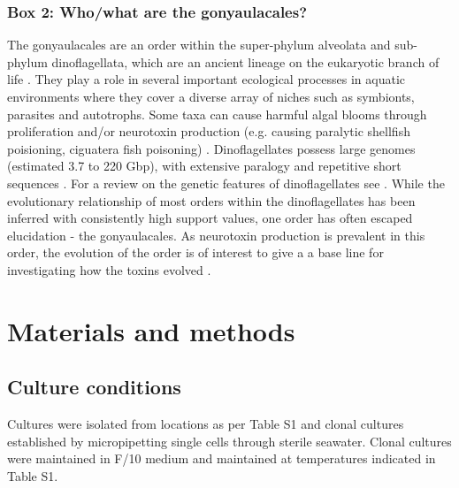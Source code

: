 \documentclass[12pt]{article}
\begin{document}
\subsubsection*{Box 2: Who/what are the gonyaulacales?}
The gonyaulacales are an order within the super-phylum alveolata and sub-phylum dinoflagellata, which are an ancient lineage on the eukaryotic branch of life \cite{moldowan1998biogeochemical}. 
They play a role in several important ecological processes in aquatic environments where they cover a diverse array of niches such as symbionts, parasites and autotrophs. 
Some taxa can cause harmful algal blooms through proliferation and/or neurotoxin production (e.g. causing paralytic shellfish poisioning, ciguatera fish poisoning) \cite{murray2016unravelling}.
Dinoflagellates possess large genomes (estimated 3.7 to 220 Gbp), with extensive paralogy and repetitive short sequences  \cite{casabianca2017genome,murray2016unravelling}. 
For a review on the genetic features of dinoflagellates see \cite{murray2016unravelling}. 
While the evolutionary relationship of most orders within the dinoflagellates has been inferred with consistently high support values, one order has often escaped elucidation - the gonyaulacales. 
As neurotoxin production is prevalent in this order, the evolution of the order is of interest to give a a base line for investigating how the toxins evolved \cite{shalchian2006combined,zhang2007three,saldarriaga2004molecular,hoppenrath2010dinoflagellate,murray2005improving}. 

\newpage
\section{Materials and methods}
\subsection*{Culture conditions}
\FloatBarrier
Cultures were isolated from locations as per Table S1 and clonal cultures established by micropipetting single cells through sterile seawater. 
Clonal cultures were maintained in F/10 medium and maintained at temperatures indicated in Table S1. 
\end{document}
